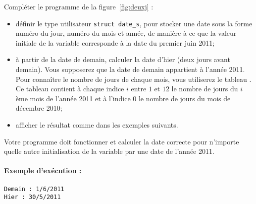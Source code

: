 \question 
Compléter le programme de la figure~\ref{fig:deuxj} :
\begin{itemize}
\item définir le type utilisateur \verb+struct date_s+, pour stocker
  une date sous la forme numéro du jour, numéro du mois et année, de
  manière à ce que la valeur initiale de la variable 
  corresponde à la date du premier juin 2011;
\item à partir de la date de demain, calculer la date d'hier (deux
  jours avant demain). Vous supposerez que la date de demain
  appartient à l'année 2011. Pour connaître le nombre de jours de
  chaque mois, vous utiliserez le tableau . Ce tableau
  contient à chaque indice $i$ entre $1$ et $12$ le nombre de jours du
  $i$ème mois de l'année 2011 et à l'indice $0$ le nombre de jours du
  mois de décembre 2010;
\item afficher le résultat comme dans les exemples suivants.
\end{itemize}

Votre programme doit fonctionner et calculer la date correcte pour
n'importe quelle autre initialisation de la variable  par
une date de l'année 2011.

\paragraph{Exemple d'exécution :}
\begin{small}
\begin{verbatim}
Demain : 1/6/2011
Hier : 30/5/2011
\end{verbatim}
\end{small}

